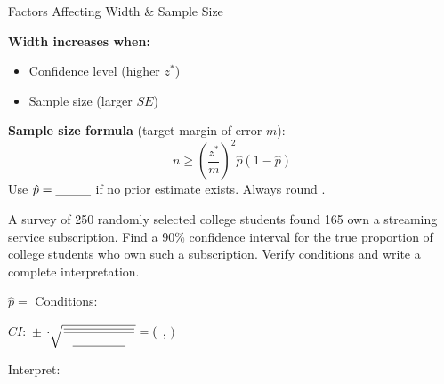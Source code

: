 \documentclass[10pt]{article}
\begin{document}
\begin{notesbox}{Factors Affecting Width \& Sample Size}
\begin{minipage}[t]{0.48\linewidth}\vspace{0pt}
  \textbf{Width increases when:}
  \begin{itemize}
    \item Confidence level \blank{2cm} (higher $z^*$)
    \item Sample size \blank{2cm} (larger $SE$)
  \end{itemize}
\end{minipage}\hfill
\begin{minipage}[t]{0.48\linewidth}\vspace{0pt}
  \textbf{Sample size formula} (target margin of error $m$):
  \[n \ge \left(\frac{z^*}{m}\right)^2 \hat p(1-\hat p)\]
  Use $\hat p = \blank{1cm}$ if no prior estimate exists. Always round \blank{2cm}.
\end{minipage}
\end{notesbox}

\begin{practicebox}
A survey of 250 randomly selected college students found 165 own a streaming service
subscription. Find a 90\% confidence interval for the true proportion of college students
who own such a subscription. Verify conditions and write a complete interpretation.

\vspace{0.05in}
$\hat p = $ \blank{2.5cm} \quad Conditions: \blank{8cm}

\vspace{0.06in}
$CI: $ \blank{1.5cm} $\pm$ \blank{1.5cm} $\cdot \sqrt{\dfrac{\blank{2cm}}{\blank{1.5cm}}}
= ($ \blank{2.5cm}, \blank{2.5cm}$)$

\vspace{0.06in}
Interpret: 
\end{practicebox}
\end{document}
